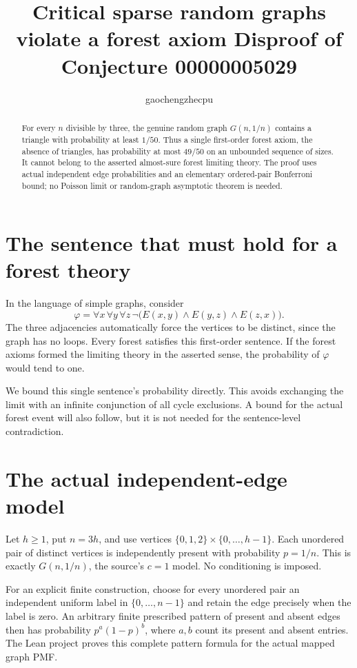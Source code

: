 \documentclass[11pt]{article}
\title{Critical sparse random graphs violate a forest axiom\newline
\large Disproof of Conjecture 00000005029}
\author{gaochengzhecpu}\date{}
\begin{document}
\maketitle
\begin{abstract}
For every $n$ divisible by three, the genuine random
graph $G(n,1/n)$ contains a triangle with probability
at least $1/50$. Thus a single first-order forest
axiom, the absence of triangles, has probability at
most $49/50$ on an unbounded sequence of sizes. It
cannot belong to the asserted almost-sure forest
limiting theory. The proof uses actual independent
edge probabilities and an elementary ordered-pair
Bonferroni bound; no Poisson limit or random-graph
asymptotic theorem is needed.
\end{abstract}

\section*{The sentence that must hold for a forest theory}
In the language of simple graphs, consider
\[
 \varphi=\forall x\,\forall y\,\forall z\,
       \neg\bigl(E(x,y)\wedge E(y,z)\wedge E(z,x)\bigr).
\]
The three adjacencies automatically force the vertices
to be distinct, since the graph has no loops.
Every forest satisfies this first-order sentence.
If the forest axioms formed the limiting theory in
the asserted sense, the probability of $\varphi$
would tend to one.

We bound this single sentence's probability directly.
This avoids exchanging the limit with an infinite
conjunction of all cycle exclusions. A bound for the
actual forest event will also follow, but it is not
needed for the sentence-level contradiction.

\section*{The actual independent-edge model}
Let $h\geq1$, put $n=3h$, and use vertices
$\{0,1,2\}\times\{0,\ldots,h-1\}$. Each unordered
pair of distinct vertices is independently present
with probability $p=1/n$. This is exactly $G(n,1/n)$,
the source's $c=1$ model. No conditioning is imposed.

For an explicit finite construction, choose for every
unordered pair an independent uniform label in
$\{0,\ldots,n-1\}$ and retain the edge precisely
when the label is zero. An arbitrary finite prescribed
pattern of present and absent edges then has probability
$p^{a}(1-p)^{b}$, where $a,b$ count its present and
absent entries. The Lean project proves this complete
pattern formula for the actual mapped graph PMF.
\end{document}
